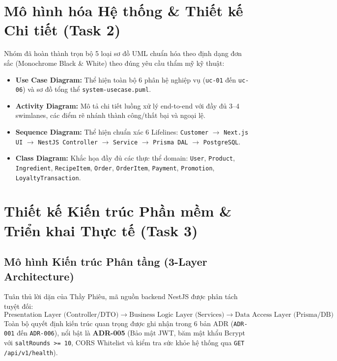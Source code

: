 \documentclass[12pt,a4paper]{article}
\begin{document}
\section{Mô hình hóa Hệ thống & Thiết kế Chi tiết (Task 2)}
Nhóm đã hoàn thành trọn bộ 5 loại sơ đồ UML chuẩn hóa theo định dạng đơn sắc (Monochrome Black \& White) theo đúng yêu cầu thẩm mỹ kỹ thuật:
\begin{itemize}[noitemsep]
    \item \textbf{Use Case Diagram:} Thể hiện toàn bộ 6 phân hệ nghiệp vụ (\texttt{uc-01} đến \texttt{uc-06}) và sơ đồ tổng thể \texttt{system-usecase.puml}.
    \item \textbf{Activity Diagram:} Mô tả chi tiết luồng xử lý end-to-end với đầy đủ 3--4 swimlanes, các điểm rẽ nhánh thành công/thất bại và ngoại lệ.
    \item \textbf{Sequence Diagram:} Thể hiện chuẩn xác 6 Lifelines: \texttt{Customer} $\rightarrow$ \texttt{Next.js UI} $\rightarrow$ \texttt{NestJS Controller} $\rightarrow$ \texttt{Service} $\rightarrow$ \texttt{Prisma DAL} $\rightarrow$ \texttt{PostgreSQL}.
    \item \textbf{Class Diagram:} Khắc họa đầy đủ các thực thể domain: \texttt{User}, \texttt{Product}, \texttt{Ingredient}, \texttt{RecipeItem}, \texttt{Order}, \texttt{OrderItem}, \texttt{Payment}, \texttt{Promotion}, \texttt{LoyaltyTransaction}.
\end{itemize}

\section{Thiết kế Kiến trúc Phần mềm \& Triển khai Thực tế (Task 3)}
\subsection{Mô hình Kiến trúc Phân tầng (3-Layer Architecture)}
Tuân thủ lời dặn của Thầy Phiêu, mã nguồn backend NestJS được phân tách tuyệt đối:
$$\text{Presentation Layer (Controller/DTO)} \longrightarrow \text{Business Logic Layer (Services)} \longrightarrow \text{Data Access Layer (Prisma/DB)}$$
Toàn bộ quyết định kiến trúc quan trọng được ghi nhận trong 6 bản ADR (\texttt{ADR-001} đến \texttt{ADR-006}), nổi bật là \textbf{ADR-005} (Bảo mật JWT, băm mật khẩu Bcrypt với \texttt{saltRounds >= 10}, CORS Whitelist và kiểm tra sức khỏe hệ thống qua \texttt{GET /api/v1/health}).
\end{document}
